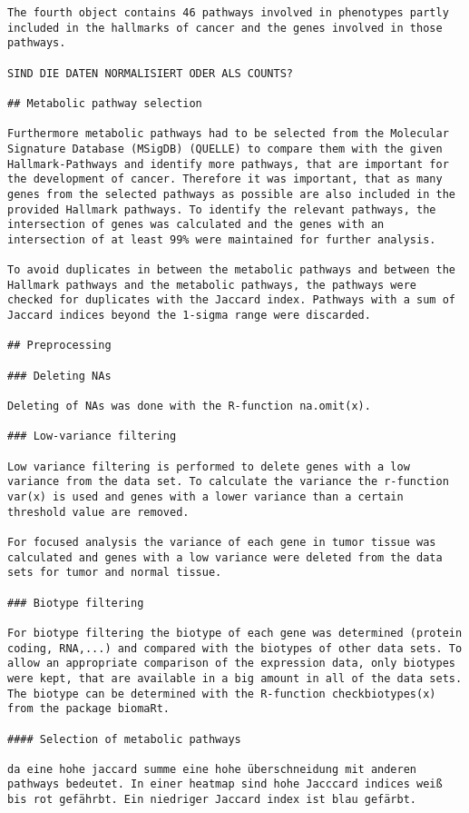 \documentclass[
  parskip,
  oneside]{scrreprt}
\begin{document}
\begin{verbatim}
The fourth object contains 46 pathways involved in phenotypes partly included in the hallmarks of cancer and the genes involved in those pathways.

SIND DIE DATEN NORMALISIERT ODER ALS COUNTS?

## Metabolic pathway selection

Furthermore metabolic pathways had to be selected from the Molecular Signature Database (MSigDB) (QUELLE) to compare them with the given Hallmark-Pathways and identify more pathways, that are important for the development of cancer. Therefore it was important, that as many genes from the selected pathways as possible are also included in the provided Hallmark pathways. To identify the relevant pathways, the intersection of genes was calculated and the genes with an intersection of at least 99% were maintained for further analysis.

To avoid duplicates in between the metabolic pathways and between the Hallmark pathways and the metabolic pathways, the pathways were checked for duplicates with the Jaccard index. Pathways with a sum of Jaccard indices beyond the 1-sigma range were discarded.

## Preprocessing

### Deleting NAs

Deleting of NAs was done with the R-function na.omit(x).

### Low-variance filtering

Low variance filtering is performed to delete genes with a low variance from the data set. To calculate the variance the r-function var(x) is used and genes with a lower variance than a certain threshold value are removed.

For focused analysis the variance of each gene in tumor tissue was calculated and genes with a low variance were deleted from the data sets for tumor and normal tissue.

### Biotype filtering

For biotype filtering the biotype of each gene was determined (protein coding, RNA,...) and compared with the biotypes of other data sets. To allow an appropriate comparison of the expression data, only biotypes were kept, that are available in a big amount in all of the data sets. The biotype can be determined with the R-function checkbiotypes(x) from the package biomaRt.

#### Selection of metabolic pathways

da eine hohe jaccard summe eine hohe überschneidung mit anderen pathways bedeutet. In einer heatmap sind hohe Jacccard indices weiß bis rot gefährbt. Ein niedriger Jaccard index ist blau gefärbt.


\end{verbatim}
\end{document}
